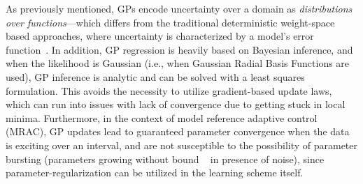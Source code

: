 \documentclass[letterpaper,12pt,peerreviewca,draftcls]{IEEEtran}
\newcommand{\XX}[1]{{\bf \color{orange}{ XX #1 XX}}}
\newcommand{\mX}[1]{\added[id=ml,remark={}]{#1}}
\newcommand{\bX}[1]{\added[id=bc,remark={}]{#1}}
\begin{document}
As previously mentioned, GPs encode uncertainty over a domain as \emph{distributions over functions}---which differs %
from the traditional deterministic weight-space based approaches, where uncertainty is characterized by a model's error function~\cite{Kim:98bk,Kingravi:TNN:2012,narendra:procIEEE:96,volyanskyy:tnn:09}. In addition, %
GP regression is heavily based on Bayesian inference, and when the likelihood is Gaussian (i.e., when Gaussian Radial Basis Functions are used), GP inference is analytic and can be solved with a least squares formulation. This avoids the necessity to utilize gradient-based update laws, which can run into issues with lack of convergence due to getting stuck in local minima. Furthermore, in the context of model reference adaptive control (MRAC), GP updates lead to guaranteed parameter convergence \cite{Chowdhary13_TNN} when the data is exciting over an interval, and are not susceptible to the  %
possibility of parameter bursting (parameters growing without bound ~\cite{astrom:bk:95,boyd:automatica:86,Narendra:86TAC} in presence of noise), since parameter-regularization can be utilized in the learning scheme itself.

\end{document}
